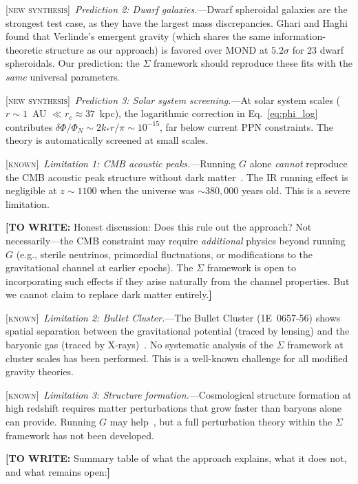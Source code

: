 \documentclass[prl,twocolumn,superscriptaddress,longbibliography,floatfix]{revtex4-2}
\newcommand{\known}{\textsc{[known]}}
\newcommand{\newsyn}{\textsc{[new synthesis]}}
\newcommand{\towrite}[1]{{\color{blue}\textbf{[TO WRITE:} #1\textbf{]}}}
\begin{document}
\newsyn\ \emph{Prediction 2: Dwarf galaxies.}---Dwarf spheroidal
galaxies are the strongest test case, as they have the largest
mass discrepancies. Ghari and Haghi~\cite{GhariHaghi2026} found
that Verlinde's emergent gravity (which shares the same
information-theoretic structure as our approach) is favored over
MOND at $5.2\sigma$ for 23 dwarf spheroidals. Our prediction:
the $\Sigma$ framework should reproduce these fits with the
\emph{same} universal parameters.

\newsyn\ \emph{Prediction 3: Solar system screening.}---At
solar system scales ($r \sim 1$~AU $\ll r_c \approx 37$~kpc), the
logarithmic correction in Eq.~\eqref{eq:phi_log} contributes
$\delta\Phi/\Phi_N \sim 2k_* r/\pi \sim 10^{-15}$, far below
current PPN constraints. The theory is automatically screened at
small scales.

\known\ \emph{Limitation 1: CMB acoustic peaks.}---Running $G$
alone \emph{cannot} reproduce the CMB acoustic peak structure
without dark matter~\cite{Kumar2025}. The IR running effect is
negligible at $z \sim 1100$ when the universe was $\sim 380{,}000$
years old. This is a severe limitation.

\towrite{Honest discussion: Does this rule out the approach? Not
necessarily---the CMB constraint may require \emph{additional}
physics beyond running $G$ (e.g., sterile neutrinos, primordial
fluctuations, or modifications to the gravitational channel at
earlier epochs). The $\Sigma$ framework is open to incorporating
such effects if they arise naturally from the channel properties.
But we cannot claim to replace dark matter entirely.}

\known\ \emph{Limitation 2: Bullet Cluster.}---The Bullet Cluster
(1E~0657-56) shows spatial separation between the gravitational
potential (traced by lensing) and the baryonic gas (traced by
X-rays)~\cite{Clowe2006}. No systematic analysis of the $\Sigma$
framework at cluster scales has been performed. This is a
well-known challenge for all modified gravity theories.

\known\ \emph{Limitation 3: Structure formation.}---Cosmological
structure formation at high redshift requires matter perturbations
that grow faster than baryons alone can provide. Running $G$ may
help~\cite{ReuterWeyer2004}, but a full perturbation theory within
the $\Sigma$ framework has not been developed.

\towrite{Summary table of what the approach explains, what it
does not, and what remains open:}
\end{document}
